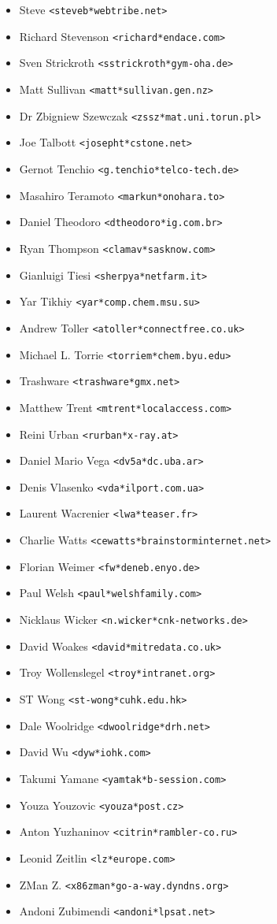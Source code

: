 \documentclass[a4paper,titlepage,12pt]{article}
\newcommand{\email}[1]{\texttt{#1}}
\begin{document}
\begin{itemize}
	\item Steve \email{<steveb*webtribe.net>}
	\item Richard Stevenson \email{<richard*endace.com>}
	\item Sven Strickroth \email{<sstrickroth*gym-oha.de>}
	\item Matt Sullivan \email{<matt*sullivan.gen.nz>}
	\item Dr Zbigniew Szewczak \email{<zssz*mat.uni.torun.pl>}
	\item Joe Talbott \email{<josepht*cstone.net>}
	\item Gernot Tenchio \email{<g.tenchio*telco-tech.de>}
	\item Masahiro Teramoto \email{<markun*onohara.to>}
	\item Daniel Theodoro \email{<dtheodoro*ig.com.br>}
	\item Ryan Thompson \email{<clamav*sasknow.com>}
	\item Gianluigi Tiesi \email{<sherpya*netfarm.it>}
	\item Yar Tikhiy \email{<yar*comp.chem.msu.su>}
	\item Andrew Toller \email{<atoller*connectfree.co.uk>}
	\item Michael L. Torrie \email{<torriem*chem.byu.edu>}
	\item Trashware \email{<trashware*gmx.net>}
	\item Matthew Trent \email{<mtrent*localaccess.com>}
	\item Reini Urban \email{<rurban*x-ray.at>}
	\item Daniel Mario Vega \email{<dv5a*dc.uba.ar>}
	\item Denis Vlasenko \email{<vda*ilport.com.ua>}
	\item Laurent Wacrenier \email{<lwa*teaser.fr>}
	\item Charlie Watts \email{<cewatts*brainstorminternet.net>}
	\item Florian Weimer \email{<fw*deneb.enyo.de>}
	\item Paul Welsh \email{<paul*welshfamily.com>}
	\item Nicklaus Wicker \email{<n.wicker*cnk-networks.de>}
	\item David Woakes \email{<david*mitredata.co.uk>}
	\item Troy Wollenslegel \email{<troy*intranet.org>}
	\item ST Wong \email{<st-wong*cuhk.edu.hk>}
	\item Dale Woolridge \email{<dwoolridge*drh.net>}
	\item David Wu \email{<dyw*iohk.com>}
	\item Takumi Yamane \email{<yamtak*b-session.com>}
	\item Youza Youzovic \email{<youza*post.cz>}
	\item Anton Yuzhaninov \email{<citrin*rambler-co.ru>}
	\item Leonid Zeitlin \email{<lz*europe.com>}
	\item ZMan Z. \email{<x86zman*go-a-way.dyndns.org>}
	\item Andoni Zubimendi \email{<andoni*lpsat.net>}
    \end{itemize}
\end{document}
